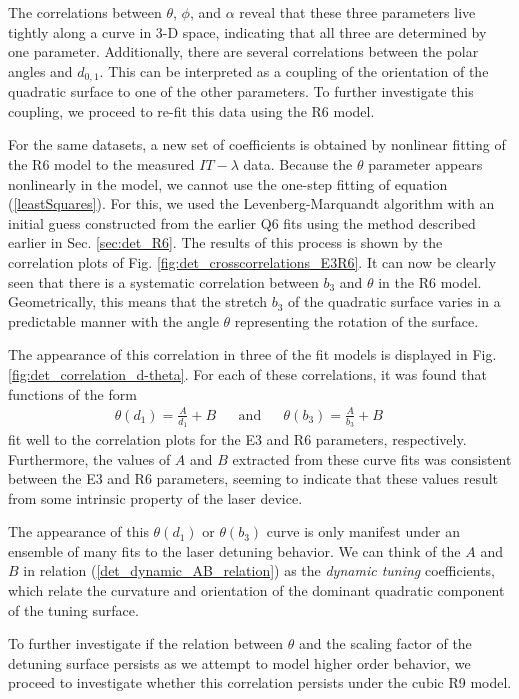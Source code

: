 \documentclass[8pt,a4paper]{report}
\begin{document}
	The correlations between $\theta$, $\phi$, and $\alpha$ reveal that these three parameters live tightly along a curve in 3-D space, indicating that all three are determined by one parameter. Additionally, there are several correlations between the polar angles and $d_{0,1}$. This can be interpreted as a coupling of the orientation of the quadratic surface to one of the other parameters. To further investigate this coupling, we proceed to re-fit this data using the R6 model.
	
	For the same datasets, a new set of coefficients is obtained by nonlinear fitting of the R6 model to the measured $IT-\lambda$ data. Because the $\theta$ parameter appears nonlinearly in the model, we cannot use the one-step fitting of equation (\ref{leastSquares}). For this, we used the Levenberg-Marquandt algorithm with an initial guess constructed from the earlier Q6 fits using the method described earlier in Sec. \ref{sec:det_R6}. The results of this process is shown by the correlation plots of Fig. \ref{fig:det_crosscorrelations_E3R6}. It can now be clearly seen that there is a systematic correlation between $b_3$ and $\theta$ in the R6 model. Geometrically, this means that the stretch $b_3$ of the quadratic surface varies in a predictable manner with the angle $\theta$ representing the rotation of the surface.
	
	The appearance of this correlation in three of the fit models is displayed in Fig. \ref{fig:det_correlation_d-theta}. For each of these correlations, it was found that functions of the form
	\begin{align} \label{det_dynamic_AB_relation}
		\theta(d_1) = \frac{A}{d_1} + B &&\text{and}&& \theta(b_3) = \frac{A}{b_3} + B &&
	\end{align}
	fit well to the correlation plots for the E3 and R6 parameters, respectively. Furthermore, the values of $A$ and $B$ extracted from these curve fits was consistent between the E3 and R6 parameters, seeming to indicate that these values result from some intrinsic property of the laser device.
	
	The appearance of this $\theta(d_1)$ or $\theta(b_3)$ curve is only manifest under an ensemble of many fits to the laser detuning behavior. We can think of the $A$ and $B$ in relation (\ref{det_dynamic_AB_relation}) as the \textit{dynamic tuning} coefficients, which relate the curvature and orientation of the dominant quadratic component of the tuning surface.
	
	To further investigate if the relation between $\theta$ and the scaling factor of the detuning surface persists as we attempt to model higher order behavior, we proceed to investigate whether this correlation persists under the cubic R9 model.
	
\end{document}
